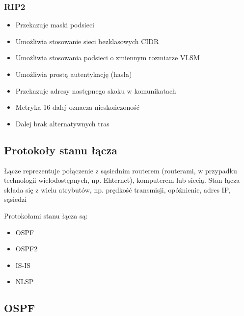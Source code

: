 \documentclass[12pt]{article}
\begin{document}
        \subsubsection{RIP2}

        \begin{itemize}
            \item Przekazuje maski podsieci
            \item Umożliwia stosowanie sieci bezklasowych CIDR
            \item Umożliwia stosowania podsieci o zmiennym rozmiarze VLSM
            \item Umożliwia prostą autentykację (hasła)
            \item Przekazuje adresy następnego skoku w komunikatach
            \item Metryka 16 dalej oznacza nieskończoność
            \item Dalej brak alternatywnych tras
        \end{itemize}

    \newpage

    \subsection{Protokoły stanu łącza}
        Łącze reprezentuje połączenie z sąsiednim routerem (routerami,
        w przypadku technologii wielodostępnych, np. Ehternet), komputerem lub siecią. Stan łącza
        składa się z wielu atrybutów, np. prędkość transmisji, opóźnienie, adres IP, sąsiedzi

        Protokołami stanu łącza są:
        \begin{itemize}
            \item OSPF
            \item OSPF2
            \item IS-IS
            \item NLSP
        \end{itemize}

        \subsection{OSPF}
\end{document}
